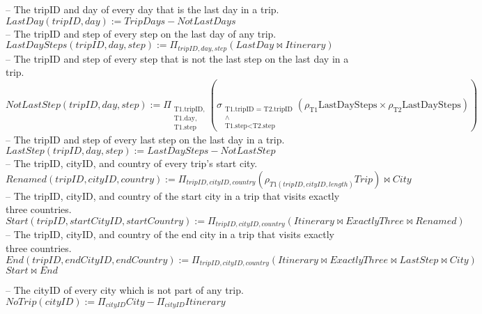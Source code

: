 \documentclass{article}
\begin{document}
\begin{enumerate}
{    -- The tripID and day of every day that is the last day in a trip. \\[5pt]
    $LastDay(tripID, day) := TripDays - NotLastDays$ \\[10pt]
    -- The tripID and step of every step on the last day of any trip. \\[5pt]
    $LastDaySteps(tripID, day, step) := \Pi_{tripID, day, step} (LastDay \bowtie Itinerary)$ \\[10pt]
    -- The tripID and step of every step that is not the last step on the last day in a trip. \\[5pt]
    $NotLastStep(tripID, day, step) := \Pi_{\substack{\text{T1.tripID,} \\ \text{T1.day,} \\ \text{T1.step}}} (\sigma_{\substack{\text{T1.tripID = T2.tripID} \\ \wedge \\ \text{T1.step} < \text{T2.step}}} (\rho_{\text{T1}}\text{LastDaySteps} \times \rho_{\text{T2}}\text{LastDaySteps}))$ \\[10pt]
    -- The tripID and step of every last step on the last day in a trip. \\[5pt]
    $LastStep(tripID, day, step) := LastDaySteps - NotLastStep$ \\[10pt]
    -- The tripID, cityID, and country of every trip's start city. \\[5pt]
    $Renamed(tripID, cityID, country) := \Pi_{tripID, cityID, country} (\rho_{T1(tripID, cityID, length)} Trip) \bowtie City$ \\[10pt]
    -- The tripID, cityID, and country of the start city in a trip that visits exactly three countries. \\[5pt]
    $Start(tripID, startCityID, startCountry) := \Pi_{tripID, cityID, country} (Itinerary \bowtie ExactlyThree \bowtie Renamed)$ \\[10pt]
    -- The tripID, cityID, and country of the end city in a trip that visits exactly three countries. \\[5pt]
    $End(tripID, endCityID, endCountry) := \Pi_{tripID, cityID, country} (Itinerary \bowtie ExactlyThree \bowtie LastStep \bowtie City)$ \\[10pt]
    $Start \bowtie End$
    \item -- The cityID of every city which is not part of any trip. \\[5pt]
    $NoTrip(cityID) := \Pi_{cityID} City - \Pi_{cityID} Itinerary$\\
}
\end{enumerate}
\end{document}
